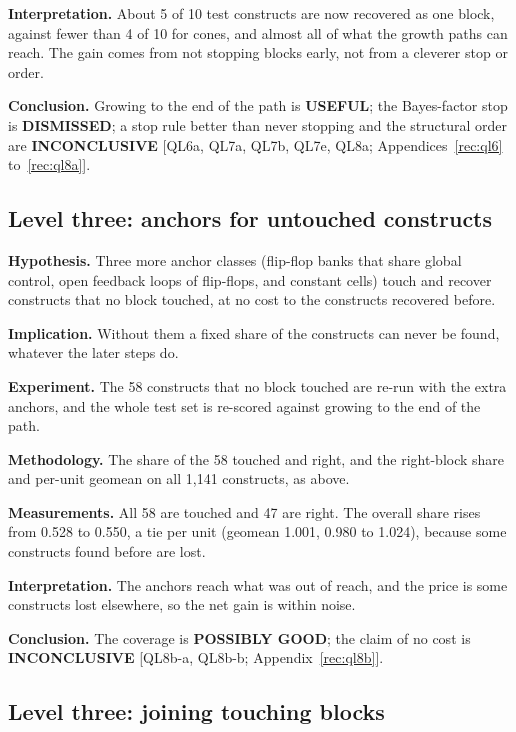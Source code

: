 \documentclass[conference]{IEEEtran}
\newcommand{\verdict}[1]{\textbf{\textsc{#1}}}
\newcommand{\hev}[1]{\par\smallskip\noindent\textbf{#1}}
\begin{document}
\hev{Interpretation.} About 5 of 10 test constructs are now recovered as one block, against fewer than 4 of 10 for cones, and almost all of what the growth paths can reach. The gain comes from not stopping blocks early, not from a cleverer stop or order.

\hev{Conclusion.} Growing to the end of the path is \verdict{USEFUL}; the Bayes-factor stop is \verdict{DISMISSED}; a stop rule better than never stopping and the structural order are \verdict{INCONCLUSIVE} [QL6a, QL7a, QL7b, QL7e, QL8a; Appendices~\ref{rec:ql6} to~\ref{rec:ql8a}].

\subsection{Level three: anchors for untouched constructs}
\label{arg:ra11}

\hev{Hypothesis.} Three more anchor classes (flip-flop banks that share global control, open feedback loops of flip-flops, and constant cells) touch and recover constructs that no block touched, at no cost to the constructs recovered before.

\hev{Implication.} Without them a fixed share of the constructs can never be found, whatever the later steps do.

\hev{Experiment.} The 58 constructs that no block touched are re-run with the extra anchors, and the whole test set is re-scored against growing to the end of the path.

\hev{Methodology.} The share of the 58 touched and right, and the right-block share and per-unit geomean on all 1,141 constructs, as above.

\hev{Measurements.} All 58 are touched and 47 are right. The overall share rises from 0.528 to 0.550, a tie per unit (geomean 1.001, 0.980 to 1.024), because some constructs found before are lost.

\hev{Interpretation.} The anchors reach what was out of reach, and the price is some constructs lost elsewhere, so the net gain is within noise.

\hev{Conclusion.} The coverage is \verdict{POSSIBLY GOOD}; the claim of no cost is \verdict{INCONCLUSIVE} [QL8b-a, QL8b-b; Appendix~\ref{rec:ql8b}].

\subsection{Level three: joining touching blocks}
\label{arg:ra12}
\end{document}
